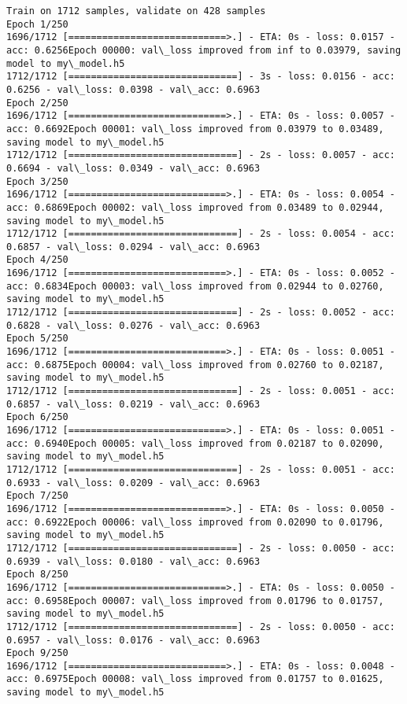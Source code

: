 \documentclass[11pt]{article}
\begin{document}
    \begin{Verbatim}[commandchars=\\\{\}]
Train on 1712 samples, validate on 428 samples
Epoch 1/250
1696/1712 [============================>.] - ETA: 0s - loss: 0.0157 - acc: 0.6256Epoch 00000: val\_loss improved from inf to 0.03979, saving model to my\_model.h5
1712/1712 [==============================] - 3s - loss: 0.0156 - acc: 0.6256 - val\_loss: 0.0398 - val\_acc: 0.6963
Epoch 2/250
1696/1712 [============================>.] - ETA: 0s - loss: 0.0057 - acc: 0.6692Epoch 00001: val\_loss improved from 0.03979 to 0.03489, saving model to my\_model.h5
1712/1712 [==============================] - 2s - loss: 0.0057 - acc: 0.6694 - val\_loss: 0.0349 - val\_acc: 0.6963
Epoch 3/250
1696/1712 [============================>.] - ETA: 0s - loss: 0.0054 - acc: 0.6869Epoch 00002: val\_loss improved from 0.03489 to 0.02944, saving model to my\_model.h5
1712/1712 [==============================] - 2s - loss: 0.0054 - acc: 0.6857 - val\_loss: 0.0294 - val\_acc: 0.6963
Epoch 4/250
1696/1712 [============================>.] - ETA: 0s - loss: 0.0052 - acc: 0.6834Epoch 00003: val\_loss improved from 0.02944 to 0.02760, saving model to my\_model.h5
1712/1712 [==============================] - 2s - loss: 0.0052 - acc: 0.6828 - val\_loss: 0.0276 - val\_acc: 0.6963
Epoch 5/250
1696/1712 [============================>.] - ETA: 0s - loss: 0.0051 - acc: 0.6875Epoch 00004: val\_loss improved from 0.02760 to 0.02187, saving model to my\_model.h5
1712/1712 [==============================] - 2s - loss: 0.0051 - acc: 0.6857 - val\_loss: 0.0219 - val\_acc: 0.6963
Epoch 6/250
1696/1712 [============================>.] - ETA: 0s - loss: 0.0051 - acc: 0.6940Epoch 00005: val\_loss improved from 0.02187 to 0.02090, saving model to my\_model.h5
1712/1712 [==============================] - 2s - loss: 0.0051 - acc: 0.6933 - val\_loss: 0.0209 - val\_acc: 0.6963
Epoch 7/250
1696/1712 [============================>.] - ETA: 0s - loss: 0.0050 - acc: 0.6922Epoch 00006: val\_loss improved from 0.02090 to 0.01796, saving model to my\_model.h5
1712/1712 [==============================] - 2s - loss: 0.0050 - acc: 0.6939 - val\_loss: 0.0180 - val\_acc: 0.6963
Epoch 8/250
1696/1712 [============================>.] - ETA: 0s - loss: 0.0050 - acc: 0.6958Epoch 00007: val\_loss improved from 0.01796 to 0.01757, saving model to my\_model.h5
1712/1712 [==============================] - 2s - loss: 0.0050 - acc: 0.6957 - val\_loss: 0.0176 - val\_acc: 0.6963
Epoch 9/250
1696/1712 [============================>.] - ETA: 0s - loss: 0.0048 - acc: 0.6975Epoch 00008: val\_loss improved from 0.01757 to 0.01625, saving model to my\_model.h5

\end{Verbatim}
\end{document}

